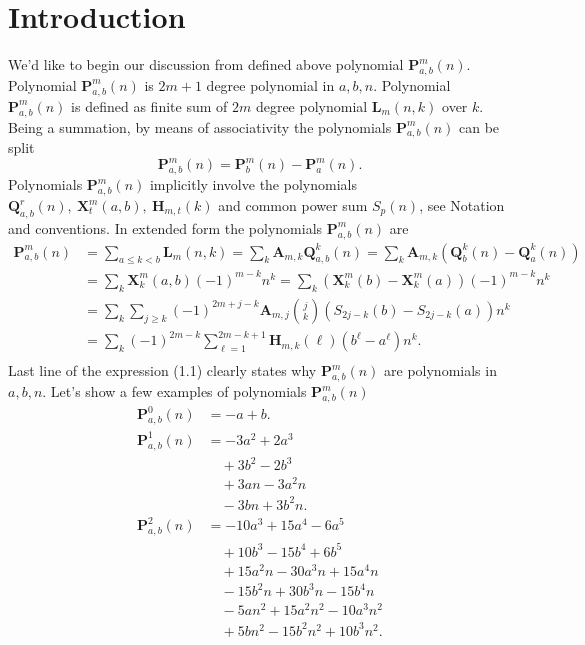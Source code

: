 \documentclass[12pt, letterpaper]{amsart}
\theoremstyle{definition}
\theoremstyle{remark}
\numberwithin{equation}{section}
\begin{document}
\setlength{\abovedisplayskip}{10pt}
\setlength{\belowdisplayskip}{10pt}
\section{Introduction}
We'd like to begin our discussion from defined above polynomial $\mathbf{P}^{m}_{a,b}(n)$. Polynomial $\mathbf{P}^{m}_{a,b}(n)$ is $2m+1$ degree polynomial in $a,b,n$. Polynomial $\mathbf{P}^{m}_{a,b}(n)$ is defined as finite sum of $2m$ degree polynomial $\mathbf{L}_m(n,k)$ over $k$. Being a summation, by means of associativity the polynomials $\mathbf{P}^{m}_{a,b}(n)$ can be split
\begin{equation*}
\mathbf{P}^{m}_{a,b}(n)=\mathbf{P}^{m}_{b}(n)-\mathbf{P}^{m}_{a}(n).
\end{equation*}
Polynomials $\mathbf{P}^{m}_{a,b}(n)$ implicitly involve the polynomials $\mathbf{Q}^{r}_{a,b}(n), \ \mathbf{X}^{m}_{t}(a,b), \ \mathbf{H}_{m,t}(k)$ and common power sum $S_p(n)$, see Notation and conventions. In extended form the polynomials $\mathbf{P}^{m}_{a,b}(n)$ are
\begin{equation}
\begin{split}
\mathbf{P}^{m}_{a,b}(n)
&=\sum_{a \leq k < b}\mathbf{L}_m(n,k)
 =\sum\limits_{k}\mathbf{A}_{m,k}\mathbf{Q}^{k}_{a,b}(n)
 =\sum\limits_{k}\mathbf{A}_{m,k}(\mathbf{Q}^{k}_{b}(n)-\mathbf{Q}^{k}_{a}(n)) \\
&=\sum_{k}\mathbf{X}^{m}_{k}(a,b) (-1)^{m-k} n^k
 =\sum_{k} (\mathbf{X}^{m}_{k}(b)-\mathbf{X}^{m}_{k}(a)) (-1)^{m-k} n^k \\
&=\sum_{k} \sum\limits_{j\geq k}(-1)^{2m+j-k} \mathbf{A}_{m,j} \binom{j}{k}(S_{2j-k}(b)-S_{2j-k}(a)) n^k \\
&=\sum_{k} (-1)^{2m-k} \sum_{\ell=1}^{2m-k+1} \mathbf{H}_{m,k}(\ell)(b^\ell - a^\ell)n^k. \\
\end{split}
\end{equation}
Last line of the expression (1.1) clearly states why $\mathbf{P}^{m}_{a,b}(n)$ are polynomials in $a,b,n$. Let's show a few examples of polynomials $\mathbf{P}^{m}_{a,b}(n)$
\begin{equation*}
\begin{split}
\mathbf{P}^{0}_{a,b}(n)
&=-a+b.\\
\mathbf{P}^{1}_{a,b}(n)
& =-3 a^2 + 2 a^3 \\
&\quad + 3 b^2 - 2 b^3 \\
&\quad + 3 a n - 3 a^2 n \\
&\quad - 3 b n + 3 b^2 n. \\
\mathbf{P}^{2}_{a,b}(n)
&=- 10 a^3 + 15 a^4 - 6 a^5 \\
&\quad + 10 b^3 - 15 b^4 + 6 b^5 \\
&\quad + 15 a^2 n - 30 a^3 n + 15 a^4 n \\
&\quad - 15 b^2 n + 30 b^3 n - 15 b^4 n \\
&\quad - 5 a n^2 + 15 a^2 n^2 - 10 a^3 n^2 \\
&\quad + 5 b n^2 - 15 b^2 n^2 + 10 b^3 n^2. \\
\end{split}
\end{equation*}
\end{document}

